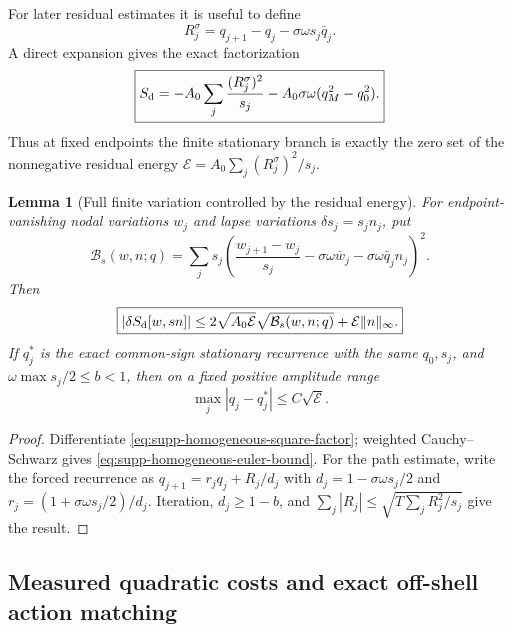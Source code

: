 \documentclass[11pt]{article}
\newtheorem{lemma}[lemma]{Lemma}
\theoremstyle{definition}
\theoremstyle{remark}
\begin{document}
For later residual estimates it is useful to define
\begin{equation}
 R_j^\sigma=q_{j+1}-q_j-\sigma\omega s_j\bar q_j.
 \label{eq:supp-homogeneous-residual}
\end{equation}
A direct expansion gives the exact factorization
\begin{equation}
 \boxed{
 S_{\rm d}=-A_0\sum_j\frac{(R_j^\sigma)^2}{s_j}
 -A_0\sigma\omega(q_M^2-q_0^2).}
 \label{eq:supp-homogeneous-square-factor}
\end{equation}
Thus at fixed endpoints the finite stationary branch is exactly the zero set of
the nonnegative residual energy
$\mathcal E=A_0\sum_j(R_j^\sigma)^2/s_j$.

\begin{lemma}[Full finite variation controlled by the residual energy]
\label{lem:supp-homogeneous-euler-control}
For endpoint-vanishing nodal variations $w_j$ and lapse variations
$\delta s_j=s_jn_j$, put
\begin{equation}
 \mathcal B_s(w,n;q)=\sum_js_j\left(
 \frac{w_{j+1}-w_j}{s_j}-\sigma\omega\bar w_j
 -\sigma\omega\bar q_jn_j\right)^2.
 \label{eq:supp-homogeneous-variation-norm}
\end{equation}
Then
\begin{equation}
 \boxed{
 |\delta S_{\rm d}[w,sn]|
 \le2\sqrt{A_0\mathcal E}\sqrt{\mathcal B_s(w,n;q)}
 +\mathcal E\|n\|_\infty.}
 \label{eq:supp-homogeneous-euler-bound}
\end{equation}
If $q_j^*$ is the exact common-sign stationary recurrence with the same
$q_0,s_j$, and $\omega\max s_j/2\le b<1$, then on a fixed positive amplitude
range
\begin{equation}
 \max_j|q_j-q_j^*|\le C\sqrt{\mathcal E}.
 \label{eq:supp-homogeneous-path-control}
\end{equation}
\end{lemma}

\begin{proof}
Differentiate \eqref{eq:supp-homogeneous-square-factor}; weighted
Cauchy--Schwarz gives \eqref{eq:supp-homogeneous-euler-bound}.  For the path
estimate, write the forced recurrence as
$q_{j+1}=r_jq_j+R_j/d_j$ with
$d_j=1-\sigma\omega s_j/2$ and
$r_j=(1+\sigma\omega s_j/2)/d_j$.  Iteration, $d_j\ge1-b$, and
$\sum_j|R_j|\le\sqrt{T\sum_jR_j^2/s_j}$ give the result.
\end{proof}

\subsection{Measured quadratic costs and exact off-shell action matching}
\end{document}
